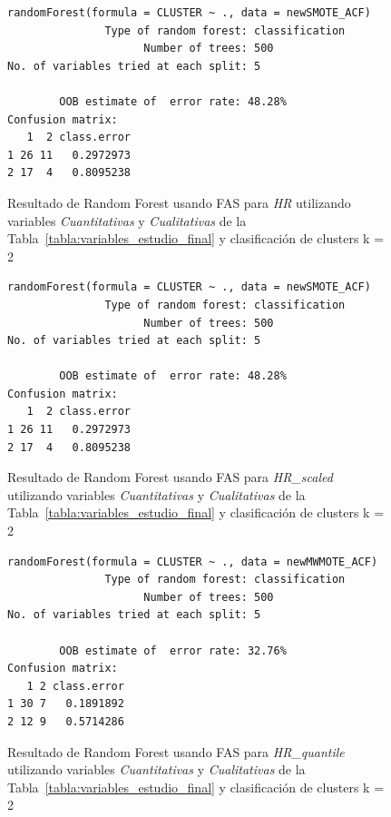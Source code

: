 \begin{figure}[H]
    \centering
    \begin{lstlisting}[frame=single, basicstyle=\small\ttfamily]
        randomForest(formula = CLUSTER ~ ., data = newSMOTE_ACF) 
               Type of random forest: classification
                     Number of trees: 500
No. of variables tried at each split: 5

        OOB estimate of  error rate: 48.28%
Confusion matrix:
   1  2 class.error
1 26 11   0.2972973
2 17  4   0.8095238
    \end{lstlisting}
    \caption{Resultado de Random Forest usando FAS para \textit{HR} utilizando variables \textit{Cuantitativas} y \textit{Cualitativas} de la Tabla~\ref{tabla:variables_estudio_final} y clasificación de clusters k = 2}\label{fig:random_forest_acf_result_1}
\end{figure}
\begin{figure}[H]
    \centering
    \begin{lstlisting}[frame=single, basicstyle=\small\ttfamily]
        randomForest(formula = CLUSTER ~ ., data = newSMOTE_ACF) 
               Type of random forest: classification
                     Number of trees: 500
No. of variables tried at each split: 5

        OOB estimate of  error rate: 48.28%
Confusion matrix:
   1  2 class.error
1 26 11   0.2972973
2 17  4   0.8095238
    \end{lstlisting}
    \caption{Resultado de Random Forest usando FAS para \textit{HR\_scaled} utilizando variables \textit{Cuantitativas} y \textit{Cualitativas} de la Tabla~\ref{tabla:variables_estudio_final} y clasificación de clusters k = 2}
    \label{fig:random_forest_acf_result_2}
\end{figure}

\begin{figure}[H]
    \centering
    \begin{lstlisting}[frame=single, basicstyle=\small\ttfamily]
        randomForest(formula = CLUSTER ~ ., data = newMWMOTE_ACF) 
               Type of random forest: classification
                     Number of trees: 500
No. of variables tried at each split: 5

        OOB estimate of  error rate: 32.76%
Confusion matrix:
   1 2 class.error
1 30 7   0.1891892
2 12 9   0.5714286
    \end{lstlisting}
    \caption{Resultado de Random Forest usando FAS para \textit{HR\_quantile} utilizando variables \textit{Cuantitativas} y \textit{Cualitativas} de la Tabla~\ref{tabla:variables_estudio_final} y clasificación de clusters k = 2}
    \label{fig:random_forest_acf_result_3}
\end{figure}

